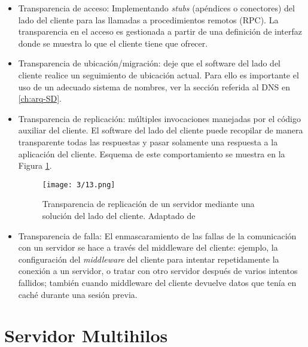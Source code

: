 	\begin{itemize} 
		
		\item Transparencia de acceso: Implementando \textit{stubs} (apéndices o conectores) del lado del cliente para las llamadas a procedimientos remotos (RPC). La transparencia en el  acceso es gestionada  a partir de una definición de interfaz donde se muestra lo que el cliente tiene que ofrecer. 		
				
		\item Transparencia de ubicación/migración: deje que el software del lado del cliente realice un seguimiento de ubicación actual. Para ello es importante el uso de un adecuado sistema de nombres, ver la sección referida al DNS en \ref{ch:arq-SD}. 
		
		\item Transparencia de replicación: múltiples invocaciones manejadas por el código auxiliar del cliente.  El software del lado del cliente puede recopilar de manera 	transparente todas las respuestas y pasar solamente una respuesta a la aplicación del cliente. Esquema  de este comportamiento se muestra en la  Figura \ref{fig:Clientes-transp}.
		
		  \begin{figure}    
		  	\begin{center} %
			\texttt{[image: 3/13.png]}
 			\caption{Transparencia de replicación de un servidor mediante una solución
 				del lado del cliente. Adaptado de \cite{Steen2017}}
			\label{fig:Clientes-transp}
		 \end{center} 
	 \end{figure} 
		 
		\item Transparencia de falla:  El enmascaramiento de las fallas de la comunicación con un servidor se hace a través del middleware del cliente:  ejemplo,   la 	configuración del \textit{middleware} del cliente para intentar repetidamente la conexión a un servidor, o  tratar con otro servidor después de varios intentos fallidos; también cuando middleware del cliente devuelve datos que tenía en caché durante una sesión previa. 
	\end{itemize}
	
	

\section{Servidor Multihilos}

